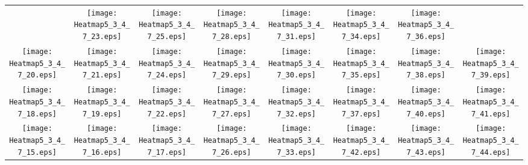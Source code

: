 \documentclass{standalone}
\begin{document}
\renewcommand{\arraystretch}{0}
\setlength{\tabcolsep}{0pt}
\begin{tabular}{ *8{c} }
 & \texttt{[image: Heatmap5\_3\_4\_7\_23.eps]} & \texttt{[image: Heatmap5\_3\_4\_7\_25.eps]} & \texttt{[image: Heatmap5\_3\_4\_7\_28.eps]} & \texttt{[image: Heatmap5\_3\_4\_7\_31.eps]} & \texttt{[image: Heatmap5\_3\_4\_7\_34.eps]} & \texttt{[image: Heatmap5\_3\_4\_7\_36.eps]} &  \\
\texttt{[image: Heatmap5\_3\_4\_7\_20.eps]} & \texttt{[image: Heatmap5\_3\_4\_7\_21.eps]} & \texttt{[image: Heatmap5\_3\_4\_7\_24.eps]} & \texttt{[image: Heatmap5\_3\_4\_7\_29.eps]} & \texttt{[image: Heatmap5\_3\_4\_7\_30.eps]} & \texttt{[image: Heatmap5\_3\_4\_7\_35.eps]} & \texttt{[image: Heatmap5\_3\_4\_7\_38.eps]} & \texttt{[image: Heatmap5\_3\_4\_7\_39.eps]} \\
\texttt{[image: Heatmap5\_3\_4\_7\_18.eps]} & \texttt{[image: Heatmap5\_3\_4\_7\_19.eps]} & \texttt{[image: Heatmap5\_3\_4\_7\_22.eps]} & \texttt{[image: Heatmap5\_3\_4\_7\_27.eps]} & \texttt{[image: Heatmap5\_3\_4\_7\_32.eps]} & \texttt{[image: Heatmap5\_3\_4\_7\_37.eps]} & \texttt{[image: Heatmap5\_3\_4\_7\_40.eps]} & \texttt{[image: Heatmap5\_3\_4\_7\_41.eps]} \\
\texttt{[image: Heatmap5\_3\_4\_7\_15.eps]} & \texttt{[image: Heatmap5\_3\_4\_7\_16.eps]} & \texttt{[image: Heatmap5\_3\_4\_7\_17.eps]} & \texttt{[image: Heatmap5\_3\_4\_7\_26.eps]} & \texttt{[image: Heatmap5\_3\_4\_7\_33.eps]} & \texttt{[image: Heatmap5\_3\_4\_7\_42.eps]} & \texttt{[image: Heatmap5\_3\_4\_7\_43.eps]} & \texttt{[image: Heatmap5\_3\_4\_7\_44.eps]} \\

\end{tabular}
\end{document}
